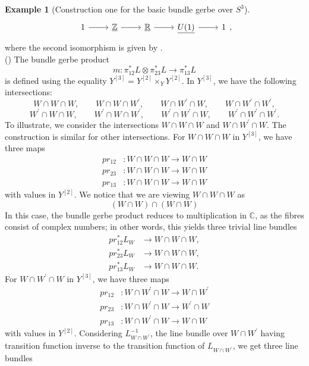 \documentclass{article}
\theoremstyle{plain}
\theoremstyle{definition}
\newtheorem{exa}[thm]{Example}
\newcommand{\rNum}[1]{\lowercase\expandafter{\romannumeral #1\relax}}
\begin{document}
\begin{exa}[Construction one for the basic bundle gerbe over $S^3$]
\[
\begin{tikzcd}
1 \arrow[r] & \underline{\mathbb{Z}} \arrow[r] & \underline{\mathbb{R}} \arrow[r] & \underline{U(1)} \arrow[r] & 1
\end{tikzcd},
\]
where the second isomorphism is given by \cite[Theorem 3.1.1 on page 184]{MR1481706}. \\
(\rNum{3}) The bundle gerbe product
\[
m:\pi_{12}^*L \otimes \pi_{23}^*L \longrightarrow \pi_{13}^*L
\]
is defined using the equality $Y^{[3]} = Y^{[2]} \times_Y Y^{[2]}$. In $Y^{[3]}$, we have the following intersections:
\[
W \cap W \cap W, \qquad W \cap W \cap W^\prime, \qquad W \cap W^\prime \cap W, \qquad W \cap W^\prime \cap W^\prime,\] \[W^\prime \cap W \cap W, \qquad W^\prime \cap W \cap W^\prime, \qquad W^\prime \cap W^\prime \cap W, \qquad W^\prime \cap W^\prime \cap W^\prime.
\]
To illustrate, we consider the intersections $W \cap W \cap W$ and $W \cap W^\prime \cap W$. The construction is similar for
other intersections. For $W \cap W \cap W$ in $Y^{[3]}$, we have three maps
\begin{align*}
pr_{12} & : W \cap W \cap W \longrightarrow W \cap W\\
pr_{23} & : W \cap W \cap W \longrightarrow W \cap W \\
pr_{13} & : W \cap W \cap W \longrightarrow W \cap W
\end{align*}
with values in $Y^{[2]}$. We notice that we are viewing $W \cap W \cap W$ as
\[
(W \cap W) \cap (W \cap W)
\]
In this case, the bundle gerbe product reduces to multiplication in $\mathbb{C}$, as the fibres consist of complex numbers; in other words, this yields three trivial line bundles
\begin{align*}
pr_{12}^*L_{W} & \longrightarrow W \cap W \cap W, \\
pr_{23}^*L_{W} & \longrightarrow W \cap W \cap W, \\
pr_{13}^*L_{W} & \longrightarrow W \cap W \cap W.
\end{align*}
For $W \cap W^\prime \cap W$ in $Y^{[3]}$, we have three maps
\begin{align*}
pr_{12} & : W \cap W^\prime \cap W \longrightarrow W \cap W^\prime \\
pr_{23} & : W \cap W^\prime \cap W \longrightarrow W^\prime \cap W \\
pr_{13} & : W \cap W^\prime \cap W \longrightarrow W \cap W
\end{align*}
with values in $Y^{[2]}$. Considering $L^{-1}_{W \cap W^\prime}$, the line bundle over $W \cap W^\prime$ having transition function inverse to the transition function of $L_{W \cap W^\prime}$, we get three line bundles

\end{exa}
\end{document}
